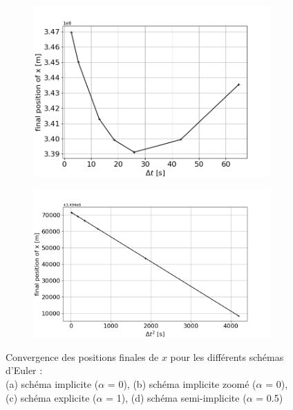 \documentclass[a4paper,12pt,twoside]{article}
\begin{document}
\begin{figure}[H]
\begin{subfigure}{0.45\textwidth}  %
    \centering  %
    \includegraphics[scale=0.42]{Graphes/convergence_x_alpha_1.png}
    \captionsetup{justification = centering, font=large}
    \caption{}
\end{subfigure}
\hspace{0.05\textwidth}
\begin{subfigure}{0.45\textwidth}  %
    \centering  %
    \includegraphics[scale=0.37]{Graphes/convergence_x_alpha_05.png}
    \captionsetup{justification = centering, font=large}
    \caption{}
\end{subfigure}
\captionsetup{justification=centering}
\caption{Convergence des positions finales de $x$ pour les différents schémas d'Euler : \\ (a) schéma implicite ($\alpha$ = 0), (b) schéma implicite zoomé ($\alpha$ = 0), \\ (c) schéma explicite ($\alpha$ = 1), (d) schéma semi-implicite ($\alpha$ = 0.5)}
\label{fig5}
\end{figure}
\end{document}

